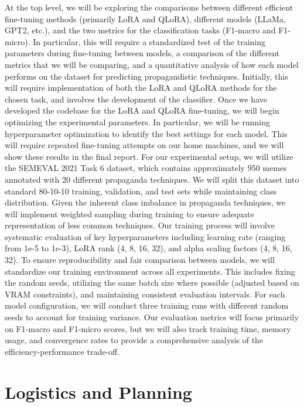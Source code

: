 \documentclass[11pt]{article}
\begin{document}
At the top level, we will be exploring the comparisons between different efficient fine-tuning methods (primarily LoRA and QLoRA), different models (LLaMa, GPT2, etc.), and the two metrics for the classification tasks (F1-macro and F1-micro). In particular, this will require a standardized test of the training parameters during fine-tuning between models, a comparison of the different metrics that we will be comparing, and a quantitative analysis of how each model performs on the dataset for predicting propagandistic techniques.
Initially, this will require implementation of both the LoRA and QLoRA methods for the chosen task, and involves the development of the classifier. Once we have developed the codebase for the LoRA and QLoRA fine-tuning, we will begin optimizing the experimental parameters. In particular, we will be running hyperparameter optimization to identify the best settings for each model. This will require repeated fine-tuning attempts on our home machines, and we will show these results in the final report.
For our experimental setup, we will utilize the SEMEVAL 2021 Task 6 dataset, which contains approximately 950 memes annotated with 20 different propaganda techniques. We will split this dataset into standard 80-10-10 training, validation, and test sets while maintaining class distribution. Given the inherent class imbalance in propaganda techniques, we will implement weighted sampling during training to ensure adequate representation of less common techniques. Our training process will involve systematic evaluation of key hyperparameters including learning rate (ranging from 1e-5 to 1e-3), LoRA rank (4, 8, 16, 32), and alpha scaling factors (4, 8, 16, 32).
To ensure reproducibility and fair comparison between models, we will standardize our training environment across all experiments. This includes fixing the random seeds, utilizing the same batch size where possible (adjusted based on VRAM constraints), and maintaining consistent evaluation intervals. For each model configuration, we will conduct three training runs with different random seeds to account for training variance. Our evaluation metrics will focus primarily on F1-macro and F1-micro scores, but we will also track training time, memory usage, and convergence rates to provide a comprehensive analysis of the efficiency-performance trade-off.


\section{Logistics and Planning}
\end{document}
